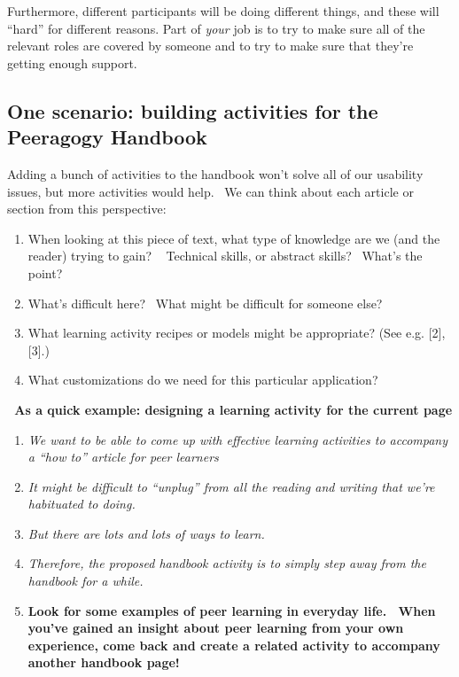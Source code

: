 Furthermore, different participants will be doing different things,
and these will ``hard'' for different reasons.  Part of \emph{your}
job is to try to make sure all of the relevant roles are covered by
someone and to try to make sure that they're getting enough
support.

\subsection{One scenario: building activities for the Peeragogy
Handbook}

Adding a bunch of activities to the handbook won't solve all of our
usability issues, but more activities would help.~ We can think about
each article or section from this perspective:

\begin{enumerate}
\itemsep1pt\parskip0pt
\item
  When looking at this piece of text, what type of knowledge are we (and
  the reader) trying to gain? ~ Technical skills, or abstract skills?~
  What's the point?
\item
  What's difficult here? ~What might be difficult for someone else?
\item
  What learning activity recipes or models might be appropriate? (See
  e.g. {[}2{]}, {[}3{]}.)
\item
  What customizations do we need for this particular application?
\end{enumerate}

\noindent\textbf{\emph{~}As a quick example: designing a learning activity for
the current page}

\begin{enumerate}
\item
  \emph{We want to be able to come up with effective learning
  activities to accompany a ``how to'' article for peer
  learners}
\item
  \emph{It might be difficult to ``unplug'' from all the reading and
  writing that we're habituated to doing.}
\item \emph{But there are lots and lots of ways to learn.}
\item
  \emph{Therefore, the proposed handbook activity is to simply step away from the
  handbook for a while.}
\item[] \textbf{Look for some examples of peer learning in
  everyday life.~ When you've gained an insight about peer learning
  from your own experience, come back and create a related activity to
  accompany another handbook page!}
\end{enumerate}

